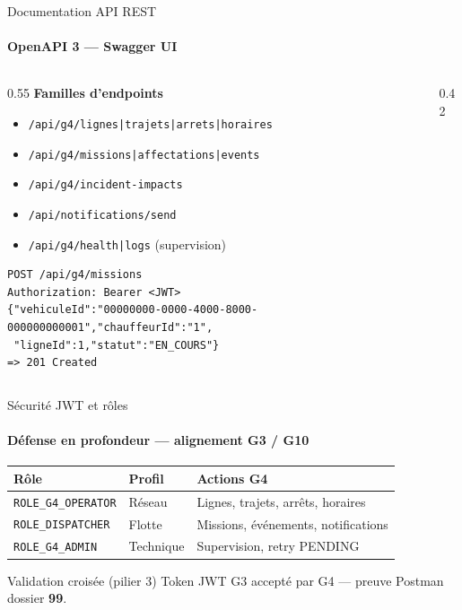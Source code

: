 \documentclass[aspectratio=169, t]{beamer}
\begin{document}
\begin{frame}{Documentation API REST}
\framesubtitle{OpenAPI 3 — Swagger UI}

\begin{columns}[T,onlytextwidth]
\begin{column}{0.55\textwidth}
  \textbf{Familles d'endpoints}
  \small
  \begin{itemize}
    \item \texttt{/api/g4/lignes|trajets|arrets|horaires}
    \item \texttt{/api/g4/missions|affectations|events}
    \item \texttt{/api/g4/incident-impacts}
    \item \texttt{/api/notifications/send}
    \item \texttt{/api/g4/health|logs} (supervision)
  \end{itemize}

  \medskip
  \begin{lstlisting}
POST /api/g4/missions
Authorization: Bearer <JWT>
{"vehiculeId":"00000000-0000-4000-8000-000000000001","chauffeurId":"1",
 "ligneId":1,"statut":"EN_COURS"}
=> 201 Created
  \end{lstlisting}
\end{column}
\begin{column}{0.42\textwidth}
\end{column}
\end{columns}
\end{frame}

\begin{frame}{Sécurité JWT et rôles}
\framesubtitle{Défense en profondeur — alignement G3 / G10}

\small
\begin{table}
\begin{tabular}{@{}llp{5.5cm}@{}}
\toprule
\textbf{Rôle} & \textbf{Profil} & \textbf{Actions G4} \\
\midrule
\texttt{ROLE\_G4\_OPERATOR} & Réseau & Lignes, trajets, arrêts, horaires \\
\rowcolor{RowHL}
\texttt{ROLE\_DISPATCHER} & Flotte & Missions, événements, notifications \\
\texttt{ROLE\_G4\_ADMIN} & Technique & Supervision, retry PENDING \\
\bottomrule
\end{tabular}
\end{table}

\begin{block}{Validation croisée (pilier 3)}
  Token JWT G3 accepté par G4 — preuve Postman dossier \textbf{99}.
\end{block}
\end{frame}
\end{document}
